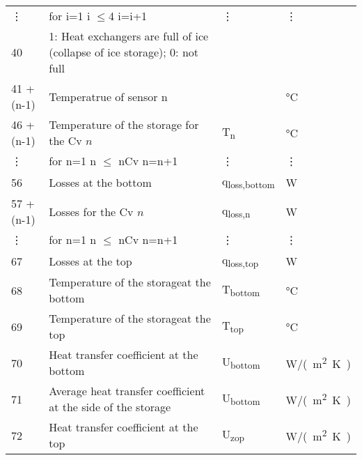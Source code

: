 \documentclass[english]{SPFReport}
\begin{document}
\begin{longtable}{| l |  m{8cm} | l | l |}
\vdots   &  for i=1 i $\leq$4 i=i+1 & \vdots & \vdots\\
40 & 1: Heat exchangers are full of ice (collapse of ice storage); 0: not full &  & \\
41 +(n-1) & Temperatrue of sensor n &&\si{\degreeCelsius}\\
46 +(n-1) & Temperature of the storage for the Cv $n$ & \si{T_{n}} & \si{\degreeCelsius}   \\
\vdots   &  for n=1 n $\leq$ nCv n=n+1 & \vdots & \vdots \\
56 & Losses at the bottom & \si{q_{loss,bottom}} & W   \\
57 +(n-1) & Losses for the Cv $n$ & \si{q_{loss,n}} & W   \\
\vdots   &  for n=1 n $\leq$ nCv n=n+1 & \vdots & \vdots \\
67 & Losses at the top & \si{q_{loss,top}} & W  \\
68 & Temperature of the storageat the bottom & \si{T_{bottom}} & \si{\degreeCelsius}   \\
69 & Temperature of the storageat the top & \si{T_{top}} & \si{\degreeCelsius}   \\
70 & Heat transfer coefficient at the bottom & \si{U_{bottom}} & \si{W/(m^2K)}\\
71 & Average heat transfer coefficient at the side of the storage & \si{U_{bottom}} &  \si{W/(m^2K)} \\
72 & Heat transfer coefficient at the top & \si{U_{zop}} & \si{W/(m^2K)} \\
\hline
\end{longtable}




\clearpage


\end{document}
